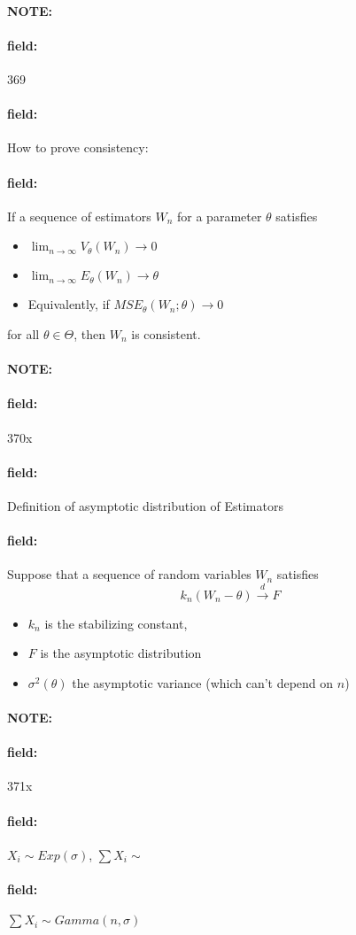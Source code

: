 \documentclass[12pt]{article}
\newenvironment{note}{\paragraph{NOTE:}}{}
\newenvironment{field}{\paragraph{field:}}{}
\begin{document}
\begin{note}
    \begin{field}
        \tiny 369
    \end{field}
    \begin{field}
        How to prove consistency:
    \end{field}
    \begin{field}
      If a sequence of estimators $W_n$ for a parameter $\theta$ satisfies
      \begin{itemize}
        \item $\lim_{n\to\infty} V_\theta(W_n) \to 0$
        \item $\lim_{n\to\infty} E_{\theta}(W_n) \to \theta$
        \item Equivalently, if $MSE_\theta(W_n;\theta) \to 0$
      \end{itemize}
      for all $\theta \in \Theta$, then $W_n$ is consistent.
    \end{field}
\end{note}

\begin{note}
    \begin{field}
        \tiny 370x
    \end{field}
    \begin{field}
        Definition of asymptotic distribution of Estimators
    \end{field}
    \begin{field}
        Suppose that a sequence of random variables $W_n$ satisfies
        $$k_n(W_n - \theta) \overset{d}{\to} F $$
        \begin{itemize}
          \item $k_n$ is the stabilizing constant,
          \item $F$ is the asymptotic distribution
          \item $\sigma^2(\theta)$ the asymptotic variance (which can't depend on $n$)
        \end{itemize}
    \end{field}
\end{note}

\begin{note}
    \begin{field}
        \tiny 371x
    \end{field}
    \begin{field}
        $X_i \sim Exp(\sigma)$, $\sum X_i \sim $
    \end{field}
    \begin{field}
        $\sum X_i \sim Gamma(n,\sigma)$
    \end{field}
\end{note}
\end{document}
